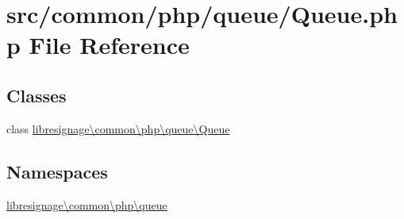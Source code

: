 \hypertarget{Queue_8php}{}\section{src/common/php/queue/\+Queue.php File Reference}
\label{Queue_8php}
\subsection*{Classes}
\begin{DoxyCompactItemize}
\item 
class \hyperlink{classlibresignage_1_1common_1_1php_1_1queue_1_1Queue}{libresignage\textbackslash{}common\textbackslash{}php\textbackslash{}queue\textbackslash{}\+Queue}
\end{DoxyCompactItemize}
\subsection*{Namespaces}
\begin{DoxyCompactItemize}
\item 
 \hyperlink{namespacelibresignage_1_1common_1_1php_1_1queue}{libresignage\textbackslash{}common\textbackslash{}php\textbackslash{}queue}
\end{DoxyCompactItemize}
